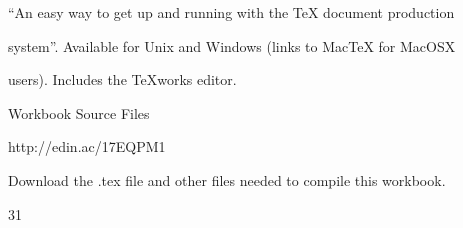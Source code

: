 \documentclass[a4paper,portrait,12pt]{article}
\begin{document}
\begin{flushleft}
{``}An easy way to get up and running with the TeX document production
\end{flushleft}


\begin{flushleft}
system''. Available for Unix and Windows (links to MacTeX for MacOSX
\end{flushleft}


\begin{flushleft}
users). Includes the TeXworks editor.
\end{flushleft}


\begin{flushleft}
Workbook Source Files
\end{flushleft}


\begin{flushleft}
http://edin.ac/17EQPM1
\end{flushleft}


\begin{flushleft}
Download the .tex file and other files needed to compile this workbook.
\end{flushleft}





31





\newpage
\end{document}
